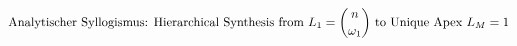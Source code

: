 \documentclass[preview]{standalone}
\begin{document}
\begin{align*}
\special{dvisvgm:raw <g id='unique000'>}\text{Analytischer Syllogismus: Hierarchical Synthesis from }L_1=\binom{n}{\omega_1}\text{ to Unique Apex }L_M=1\special{dvisvgm:raw </g>}
\end{align*}
\end{document}
